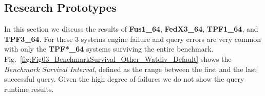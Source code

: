 \documentclass[twocolumn]{bmcart}%
\begin{document}
\subsection{Research Prototypes}
\label{subsec:semweb}
%

%
%
%
%

In this section we discuss the results of \textbf{Fus1\_64}, \textbf{FedX3\_64}, \textbf{TPF1\_64}, and \textbf{TPF3\_64}. 
For these 3 systems engine failure and query errors are very common with only the \textbf{TPF*\_64} systems surviving the entire benchmark.
Fig.~\ref{fig:Fig03_BenchmarkSurvival_Other_Watdiv_Default} shows the \emph{Benchmark Survival Interval}, defined as the range between the first and the last successful query. 
Given the high degree of failures we do not show the query runtime results.

\end{document}
